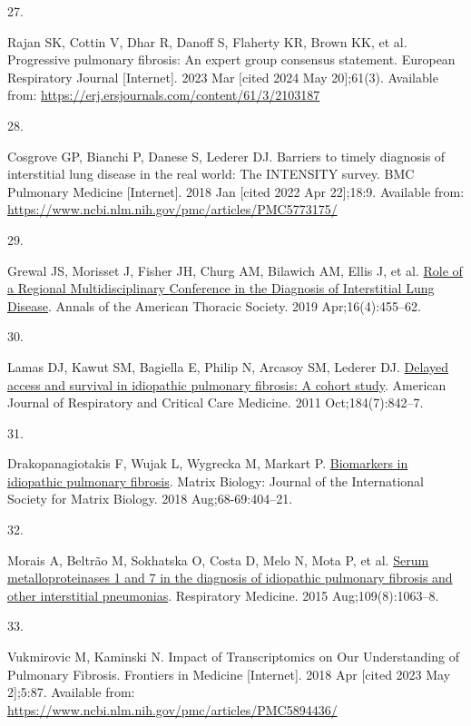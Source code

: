 \documentclass[
]{article}
\newlength{\cslhangindent}
\newlength{\csllabelwidth}
\newenvironment{CSLReferences}[2] %
 {\begin{list}{}{%
  \setlength{\itemindent}{0pt}
  \setlength{\leftmargin}{0pt}
  \setlength{\parsep}{0pt}
  \ifodd #1
   \setlength{\leftmargin}{\cslhangindent}
   \setlength{\itemindent}{-1\cslhangindent}
  \fi
  \setlength{\itemsep}{#2\baselineskip}}}
 {\end{list}}
\newcommand{\CSLLeftMargin}[1]{\parbox[t]{\csllabelwidth}{\strut#1\strut}}
\newcommand{\CSLRightInline}[1]{\parbox[t]{\linewidth - \csllabelwidth}{\strut#1\strut}}
\begin{document}
\begin{CSLReferences}{0}{1}
\CSLLeftMargin{27. }%
\CSLRightInline{Rajan SK, Cottin V, Dhar R, Danoff S, Flaherty KR, Brown KK, et al. Progressive pulmonary fibrosis: An expert group consensus statement. European Respiratory Journal {[}Internet{]}. 2023 Mar {[}cited 2024 May 20{]};61(3). Available from: \url{https://erj.ersjournals.com/content/61/3/2103187}}

\CSLLeftMargin{28. }%
\CSLRightInline{Cosgrove GP, Bianchi P, Danese S, Lederer DJ. Barriers to timely diagnosis of interstitial lung disease in the real world: The {INTENSITY} survey. BMC Pulmonary Medicine {[}Internet{]}. 2018 Jan {[}cited 2022 Apr 22{]};18:9. Available from: \url{https://www.ncbi.nlm.nih.gov/pmc/articles/PMC5773175/}}

\CSLLeftMargin{29. }%
\CSLRightInline{Grewal JS, Morisset J, Fisher JH, Churg AM, Bilawich AM, Ellis J, et al. \href{https://doi.org/10.1513/AnnalsATS.201811-794OC}{Role of a {Regional} {Multidisciplinary} {Conference} in the {Diagnosis} of {Interstitial} {Lung} {Disease}}. Annals of the American Thoracic Society. 2019 Apr;16(4):455--62. }

\CSLLeftMargin{30. }%
\CSLRightInline{Lamas DJ, Kawut SM, Bagiella E, Philip N, Arcasoy SM, Lederer DJ. \href{https://doi.org/10.1164/rccm.201104-0668OC}{Delayed access and survival in idiopathic pulmonary fibrosis: A cohort study}. American Journal of Respiratory and Critical Care Medicine. 2011 Oct;184(7):842--7. }

\CSLLeftMargin{31. }%
\CSLRightInline{Drakopanagiotakis F, Wujak L, Wygrecka M, Markart P. \href{https://doi.org/10.1016/j.matbio.2018.01.023}{Biomarkers in idiopathic pulmonary fibrosis}. Matrix Biology: Journal of the International Society for Matrix Biology. 2018 Aug;68-69:404--21. }

\CSLLeftMargin{32. }%
\CSLRightInline{Morais A, Beltrão M, Sokhatska O, Costa D, Melo N, Mota P, et al. \href{https://doi.org/10.1016/j.rmed.2015.06.003}{Serum metalloproteinases 1 and 7 in the diagnosis of idiopathic pulmonary fibrosis and other interstitial pneumonias}. Respiratory Medicine. 2015 Aug;109(8):1063--8. }

\CSLLeftMargin{33. }%
\CSLRightInline{Vukmirovic M, Kaminski N. Impact of {Transcriptomics} on {Our} {Understanding} of {Pulmonary} {Fibrosis}. Frontiers in Medicine {[}Internet{]}. 2018 Apr {[}cited 2023 May 2{]};5:87. Available from: \url{https://www.ncbi.nlm.nih.gov/pmc/articles/PMC5894436/}}


\end{CSLReferences}
\end{document}

